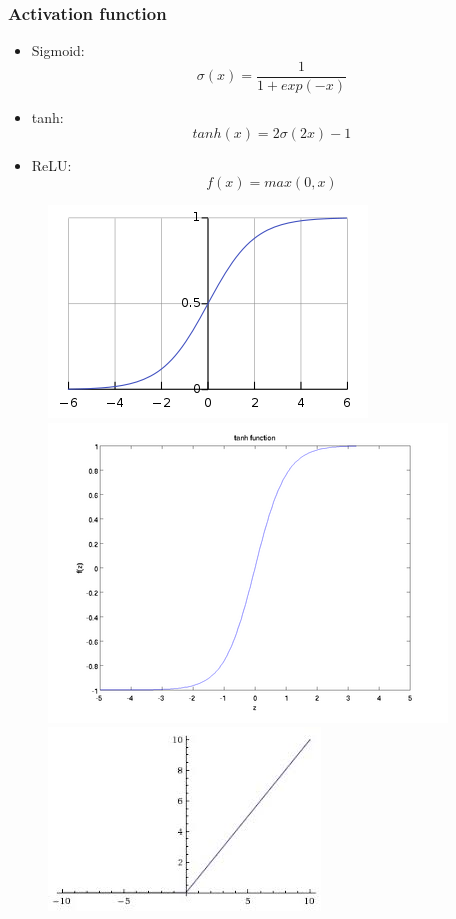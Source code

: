 \documentclass{beamer} %
\begin{document}
\begin{frame}
\frametitle{Activation function}
\begin{itemize}
	\item Sigmoid: $$\sigma(x) = \frac{1}{1+exp(-x)}$$
	\item tanh: $$tanh(x) = 2 \sigma(2x) -1 $$
	\item ReLU: $$f(x) = max(0,x)$$
\end{itemize}
\end{frame}
\begin{frame}
 \begin{figure}[htbp] 
	
	\begin{center}
		\includegraphics[scale=0.5]{./image/sigmoid} 
		\label{fig:sigmoid}		
		\includegraphics[scale=0.33]{./image/tanh}
		\label{fig:tanh}
		\includegraphics[scale=0.5]{./image/relu}
		\label{fig:relu}
	\end{center}
\end{figure}
\end{frame}
\end{document}
